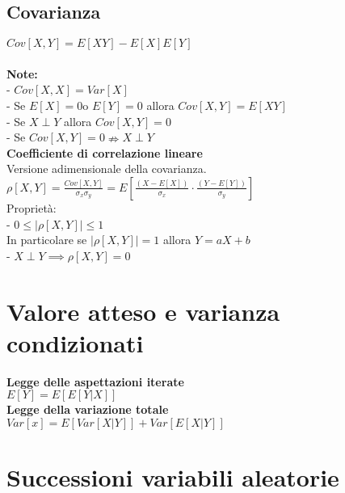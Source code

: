 \documentclass{article}
\begin{document}
\begin{multicols*}{3}
		\subsection{Covarianza}
		\(Cov[X,Y] = E[XY] -E[X]E[Y]\)\\\\
		\textbf{Note:}\\
		- \(Cov[X,X] = Var[X]\)\\
		- Se \(E[X] = 0 \)o \(E[Y] = 0\) allora \(Cov[X,Y] = E[XY]\)\\
		- Se \(X\perp Y\) allora \(Cov[X,Y] =0\)\\
		- Se \(Cov[X,Y] = 0 \nRightarrow X\perp Y\)\\ 
		\textbf{Coefficiente di correlazione lineare}\\
		Versione adimensionale della covarianza.\\
		\(\rho[X,Y] = \frac{Cov[X,Y]}{\sigma_x\sigma_y}= E[\frac{(X-E[X])}{\sigma_x}\cdot \frac{(Y-E[Y])}{\sigma_y}]\)\\
		Proprietà:\\
		- \(0\leq|\rho[X,Y]| \leq 1\)\\
		In particolare se \(|\rho[X,Y]| = 1\) allora \(Y=aX+b\)\\
		- \(X\perp Y \implies\rho[X,Y] = 0 \)
		\section{Valore atteso e varianza condizionati}
		\textbf{Legge delle aspettazioni iterate}\\
		\(E[Y] = E[E[Y|X]]\)\\
		\textbf{Legge della variazione totale}\\
		\(Var[x] = E[Var[X|Y]] + Var[E[X|Y]] \)\\
		\section{Successioni variabili aleatorie}
		
		
		
		
		
		
		
		
		
		 
		
		
		
		
		
		
		
	\end{multicols*}
\end{document}
